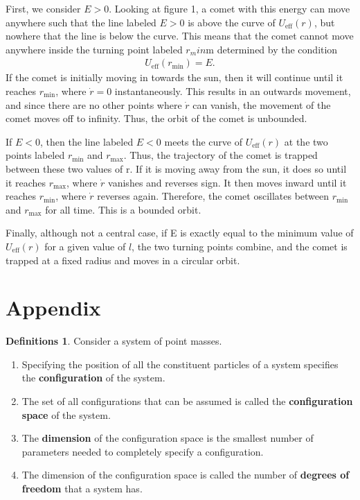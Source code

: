 \documentclass[10pt, psamsfonts]{amsart}
\theoremstyle{definition}
\newtheorem{defns}[thm]{Definitions}
\theoremstyle{remark}
\numberwithin{equation}{section}
\begin{document}
First, we consider $E>0$. Looking at figure 1, a comet with this energy can move anywhere such that the line labeled $E>0$ is above the curve of $U_{\text{eff}}(r)$, but nowhere that the line is below the curve. This means that the comet cannot move anywhere inside the turning point labeled $r_min$m determined by the condition
\begin{align*}
  U_\text{eff}(r_\text{min}) = E.
\end{align*}
If the comet is initially moving in towards the sun, then it will continue until it reaches $r_\text{min}$, where $\dot{r} = 0$ instantaneously. This results in an outwards movement, and since there are no other points where $\dot{r}$ can vanish, the movement of the comet moves off to infinity. Thus, the orbit of the comet is unbounded.

If $E<0$, then the line labeled $E<0$ meets the curve of $U_\text{eff}(r)$ at the two points labeled $r_\text{min}$ and $r_\text{max}$. Thus, the trajectory of the comet is trapped between these two values of r. If it is moving away from the sun, it does so until it reaches $r_\text{max}$, where $\dot{r}$ vanishes and reverses sign. It then moves inward until it reaches $r_\text{min}$, where $\dot{r}$ reverses again. Therefore, the comet oscillates between $r_\text{min}$ and $r_\text{max}$ for all time. This is a bounded orbit.

Finally, although not a central case, if E is exactly equal to the minimum value of $U_\text{eff}(r)$ for a given value of $l$, the two turning points combine, and the comet is trapped at a fixed radius and moves in a circular orbit.




\newpage
\section{Appendix}
\begin{defns}
    \label{def: Configuration Space}
  Consider a system of point masses. 
  \begin{enumerate}
    \item Specifying the position of all the constituent particles of a system specifies the \textbf{configuration} of the system.
    \item The set of all configurations that can be assumed is called the \textbf{configuration space} of the system.
    \item The \textbf{dimension} of the configuration space is the smallest number of parameters needed to completely specify a configuration.
    \item The dimension of the configuration space is called the number of \textbf{degrees of freedom} that a system has.
  \end{enumerate}
\end{defns}
\end{document}
